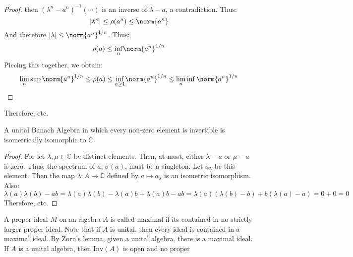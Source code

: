 \begin{proof}
            then $(\lambda^{n}-a^{n})^{\minus{1}}(\cdots)$ is
            an inverse of $\lambda-a$, a contradiction. Thus:
            \begin{equation}
                |\lambda^{n}|\leq\rho(a^{n})\leq\norm{a^{n}}
            \end{equation}
            And therefore $|\lambda|\leq\norm{a^{n}}^{1/n}$.
            Thus:
            \begin{equation}
                \rho(a)\leq\underset{n}{\inf}\norm{a^{n}}^{1/n}
            \end{equation}
            Piecing this together, we obtain:
            \begin{equation}
                \underset{n}{\lim}\sup\norm{a^{n}}^{1/n}
                \leq\rho(a)\leq\underset{n\geq{1}}{\inf}
                \norm{a^{n}}^{1/n}\leq\underset{n}{\lim}\inf
                \norm{a^{n}}^{1/n}
            \end{equation}
        \end{proof}
        Therefore, etc.
        \begin{theorem}
            A unital Banach Algebra in which every non-zero
            element is invertible is isometrically isomorphic
            to $\mathbb{C}$.
        \end{theorem}
        \begin{proof}
            For let $\lambda,\mu\in\mathbb{C}$ be distinct
            elements. Then, at most, either $\lambda-a$ or
            $\mu-a$ is zero. Thus, the spectrum of $a$,
            $\sigma(a)$, must be a singleton. Let
            $a_{\lambda}$ be this element. Then the map
            $\lambda:A\rightarrow\mathbb{C}$ defined by
            $a\mapsto{a}_{\lambda}$ is an isometric isomorphism.
            Also:
            \begin{equation}
                \lambda(a)\lambda(b)-ab
                =\lambda(a)\lambda(b)-\lambda(a)b+\lambda(a)b
                    -ab
                =\lambda(a)(\lambda(b)-b)+b(\lambda(a)-a)
                =0+0
                =0
            \end{equation}
            Therefore, etc.
        \end{proof}
        A proper ideal $M$ on an algebra $A$ is called maximal
        if its contained in no strictly larger proper ideal.
        Note that if $A$ is unital, then every ideal is contained
        in a maximal ideal. By Zorn's lemma, given a unital
        algebra, there is a maximal ideal. If $A$ is a unital
        algebra, then $\mathrm{Inv}(A)$ is open and no proper
